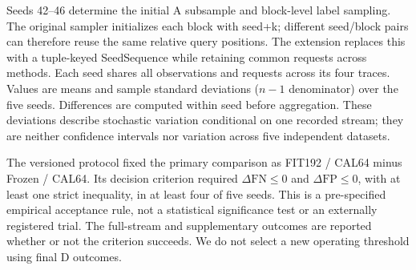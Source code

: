 Seeds 42--46 determine the initial A subsample and block-level label sampling. The original sampler initializes each block with seed+k; different seed/block pairs can therefore reuse the same relative query positions. The extension replaces this with a tuple-keyed SeedSequence while retaining common requests across methods. Each seed shares all observations and requests across its four traces. Values are means and sample standard deviations ($n-1$ denominator) over the five seeds. Differences are computed within seed before aggregation. These deviations describe stochastic variation conditional on one recorded stream; they are neither confidence intervals nor variation across five independent datasets.

The versioned protocol fixed the primary comparison as FIT192 / CAL64 minus Frozen / CAL64. Its decision criterion required $\Delta\mathrm{FN}\leq0$ and $\Delta\mathrm{FP}\leq0$, with at least one strict inequality, in at least four of five seeds. This is a pre-specified empirical acceptance rule, not a statistical significance test or an externally registered trial. The full-stream and supplementary outcomes are reported whether or not the criterion succeeds. We do not select a new operating threshold using final D outcomes.

